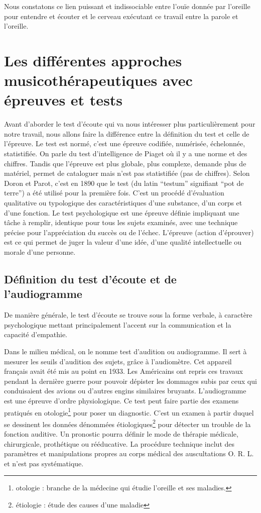 Nous constatons ce lien puissant et indissociable  entre l'ouïe donnée
par l'oreille pour entendre et écouter et le cerveau exécutant ce
travail entre la 
parole et l'oreille.








\chapter{Les différentes approches musicothérapeutiques avec épreuves
  et tests}
Avant d'aborder le test d'écoute qui va nous intéresser plus
particulièrement pour notre travail, nous allons faire la différence
entre la définition du test et celle de l'épreuve.
Le test est normé, c'est une épreuve codifiée, numérisée, échelonnée,
statistifiée. On parle du test d'intelligence de Piaget où il y a une
norme et des chiffres. Tandis que l'épreuve est plus globale, plus complexe,
demande plus de matériel, permet de
cataloguer mais n'est pas statistifiée (pas de chiffres).
Selon Doron et Parot, c'est en 1890 que le test (du latin ``testum''
signifiant ``pot de terre'') a été utilisé pour la
première fois. C'est un procédé d'évaluation qualitative ou
typologique des caractéristiques d'une substance, d'un corps et d'une
fonction.
Le test psychologique est une épreuve définie impliquant une tâche à
remplir, identique pour tous les sujets examinés, avec une technique
précise pour l'appréciation du succès ou de l'échec.
L'épreuve (action d'éprouver) est ce qui permet de juger la valeur
d'une idée, d'une qualité intellectuelle ou morale d'une personne.

\section{Définition du test d'écoute et de l'audiogramme}

De manière générale, le test d'écoute se trouve sous la forme verbale,
à caractère  
psychologique mettant principalement l'accent sur la communication
et la capacité d'empathie.

Dans le milieu médical, on le nomme test d'audition ou audiogramme. Il
sert à mesurer les seuils d'audition des sujets, grâce à l'audiomètre. Cet 
appareil français avait été mis au point en 1933. Les Américains
ont repris ces travaux pendant la dernière guerre pour pouvoir dépister
les dommages subis par ceux qui conduisaient des avions ou d'autres
engins similaires bruyants.
  L'audiogramme est une épreuve d'ordre physiologique. Ce test peut faire partie des examens  pratiqués en otologie\footnote{otologie : branche de la médecine
  	qui étudie l'oreille et ses maladies.} pour poser un diagnostic. 
   C'est un examen à partir duquel se
  dessinent les données dénommées étiologiques\footnote{étiologie : étude des causes
  	d'une maladie} pour détecter un trouble de la fonction auditive. Un pronostic pourra définir le mode de thérapie
médicale, chirurgicale, prothétique ou rééducative. La procédure
technique inclut des paramètres et manipulations propres au corps
médical des auscultations O. R. L. et  n'est pas systématique.







